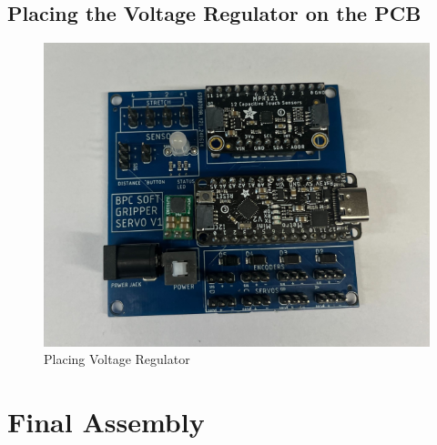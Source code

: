 \documentclass{article}
\begin{document}
\subsection{Placing the Voltage Regulator on the PCB}
\begin{figure}[H]
    \centering
    \includegraphics[width=0.5\linewidth]{PCBImages/PlacingPCBComponents/placing_pcb_components_4.png}
    \caption{Placing Voltage Regulator}
    \label{fig:enter-label}
\end{figure}



\section{Final Assembly}
\end{document}
